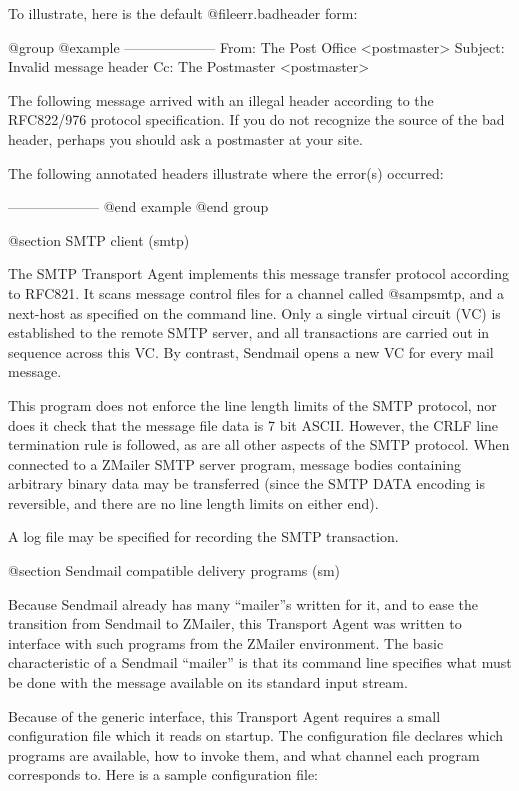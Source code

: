 {{To illustrate, here is the default @file{err.badheader} form:

@group
@example
--------------------
From:   The Post Office <postmaster>
Subject: Invalid message header
Cc:     The Postmaster <postmaster>

The following message arrived with an illegal header according to the
RFC822/976 protocol specification. If you do not recognize the source
of the bad header, perhaps you should ask a postmaster at your site.

The following annotated headers illustrate where the error(s) occurred:

--------------------
@end example
@end group

@section SMTP client (smtp)

The SMTP Transport Agent implements this message transfer protocol
according to RFC821.  It scans message control files for a channel called
@samp{smtp}, and a next-host as specified on the command line.  Only a single
virtual circuit (VC) is established to the remote SMTP server, and all
transactions are carried out in sequence across this VC.  By contrast,
Sendmail opens a new VC for every mail message.

This program does not enforce the line length limits of the SMTP protocol,
nor does it check that the message file data is 7 bit ASCII.  However, the
CRLF line termination rule is followed, as are all other aspects of the SMTP
protocol.  When connected to a ZMailer SMTP server program, message bodies
containing arbitrary binary data may be transferred (since the SMTP DATA
encoding is reversible, and there are no line length limits on either end).

A log file may be specified for recording the SMTP transaction.

@section Sendmail compatible delivery programs (sm)

Because Sendmail already has many ``mailer''s written for it, and to ease the
transition from Sendmail to ZMailer, this Transport Agent was written to
interface with such programs from the ZMailer environment.  The basic
characteristic of a Sendmail ``mailer'' is that its command line specifies
what must be done with the message available on its standard input stream.

Because of the generic interface, this Transport Agent requires a small
configuration file which it reads on startup.  The configuration file declares
which programs are available, how to invoke them, and what channel each
program corresponds to.  Here is a sample configuration file:

}}
